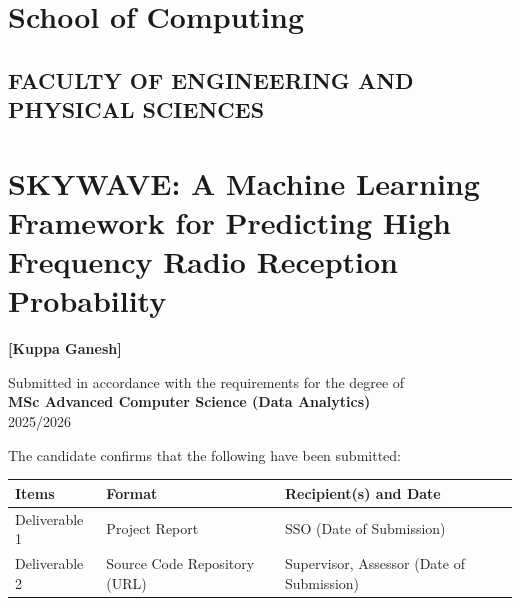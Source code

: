 \section{School of Computing}\label{school-of-computing}

\subsection{FACULTY OF ENGINEERING AND PHYSICAL
SCIENCES}\label{faculty-of-engineering-and-physical-sciences}

\section{SKYWAVE: A Machine Learning Framework for Predicting High
Frequency Radio Reception
Probability}\label{skywave-a-machine-learning-framework-for-predicting-high-frequency-radio-reception-probability}

\textbf{{[}Kuppa Ganesh{]}}

Submitted in accordance with the requirements for the degree of\\
\textbf{MSc Advanced Computer Science (Data Analytics)}\\
2025/2026

The candidate confirms that the following have been submitted:

{\def\LTcaptype{none} %
\begin{longtable}[]{@{}
  >{\raggedright\arraybackslash}p{}
  >{\raggedright\arraybackslash}p{}
  >{\raggedright\arraybackslash}p{}@{}}
\toprule\noalign{}
\begin{minipage}[b]{\linewidth}\raggedright
Items
\end{minipage} & \begin{minipage}[b]{\linewidth}\raggedright
Format
\end{minipage} & \begin{minipage}[b]{\linewidth}\raggedright
Recipient(s) and Date
\end{minipage} \\
\midrule\noalign{}
\endhead
\bottomrule\noalign{}
\endlastfoot
Deliverable 1 & Project Report & SSO (Date of Submission) \\
Deliverable 2 & Source Code Repository (URL) & Supervisor, Assessor
(Date of Submission) \\
\end{longtable}
}

